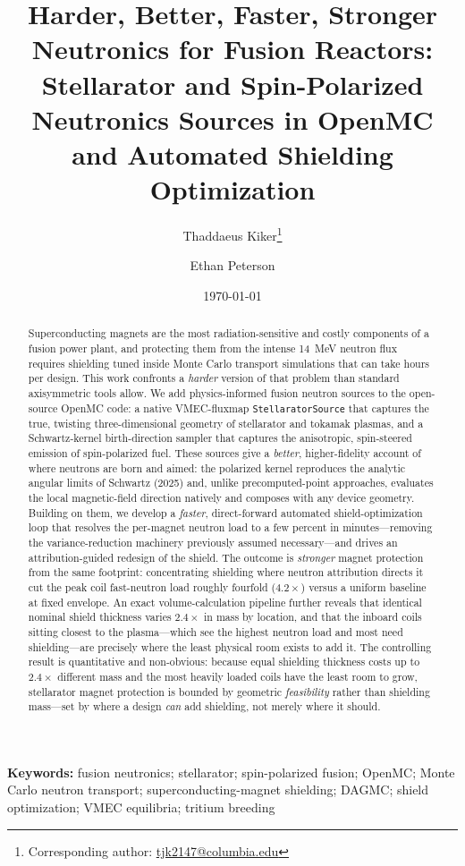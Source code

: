 \documentclass[11pt]{article}
\title{\bfseries Harder, Better, Faster, Stronger Neutronics for Fusion
Reactors: Stellarator and Spin-Polarized Neutronics Sources in OpenMC and
Automated Shielding Optimization}
\author[1,2]{Thaddaeus Kiker\thanks{Corresponding author:
\href{mailto:tjk2147@columbia.edu}{tjk2147@columbia.edu}}}
\author[3]{Ethan Peterson}
\affil[1]{Department of Astronomy, Columbia University,
550 West 120th Street, New York, NY 10027, USA}
\affil[2]{Columbia Fusion Research Center, Columbia University,
New York, NY 10027, USA}
\affil[3]{Plasma Science and Fusion Center, Massachusetts Institute of
Technology, 175 Albany Street, Cambridge, MA 02139, USA}
\date{\today}
\providecommand{\keywords}[1]{\vspace{0.6em}\noindent\small\textbf{Keywords:} #1}
\begin{document}
\maketitle

\begin{abstract}
\noindent
Superconducting magnets are the most radiation-sensitive and costly
components of a fusion power plant, and protecting them from the intense
\SI{14}{\MeV} neutron flux requires shielding tuned inside Monte Carlo
transport simulations that can take hours per design. This work confronts a
\emph{harder} version of that problem than standard axisymmetric tools allow.
We add physics-informed fusion neutron sources to the open-source OpenMC code:
a native VMEC-fluxmap \texttt{StellaratorSource} that captures the true,
twisting three-dimensional geometry of stellarator and tokamak plasmas, and a
Schwartz-kernel birth-direction sampler that captures the anisotropic,
spin-steered emission of spin-polarized fuel. These sources give a
\emph{better}, higher-fidelity account of where neutrons are born and aimed:
the polarized kernel reproduces the analytic angular limits of Schwartz (2025)
and, unlike precomputed-point approaches, evaluates the local magnetic-field
direction natively and composes with any device geometry. Building on them, we
develop a \emph{faster}, direct-forward automated shield-optimization loop that
resolves the per-magnet neutron load to a few percent in minutes---removing the
variance-reduction machinery previously assumed necessary---and drives an
attribution-guided redesign of the shield. The outcome is \emph{stronger}
magnet protection from the same footprint: concentrating shielding where
neutron attribution directs it cut the peak coil fast-neutron load roughly
fourfold ($4.2\times$) versus a uniform baseline at fixed envelope. An exact
volume-calculation pipeline further reveals that identical nominal shield
thickness varies $2.4\times$ in mass by location, and that the inboard coils
sitting closest to the plasma---which see the highest neutron load and most
need shielding---are precisely where the least physical room exists to add it.
The controlling result is quantitative and non-obvious: because equal shielding
thickness costs up to $2.4\times$ different mass and the most heavily loaded
coils have the least room to grow, stellarator magnet protection is bounded by
geometric \emph{feasibility} rather than shielding mass---set by where a design
\emph{can} add shielding, not merely where it should.
\end{abstract}

\keywords{fusion neutronics; stellarator; spin-polarized fusion; OpenMC;
Monte Carlo neutron transport; superconducting-magnet shielding; DAGMC;
shield optimization; VMEC equilibria; tritium breeding}
\end{document}
